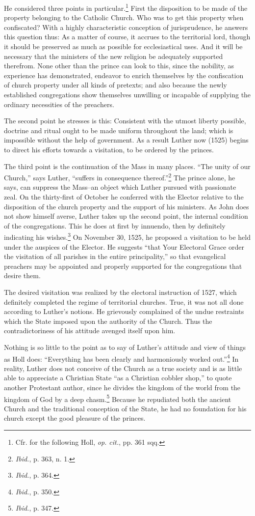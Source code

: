 He considered three points in particular.\footnote{Cfr. for the following Holl, \textit{op. cit.}, pp. 361 sqq.}
First the disposition to be made
of the property belonging to the Catholic Church. Who was to get this
property when confiscated? With a highly characteristic conception of jurisprudence,
he answers this question thus: As a matter of course, it accrues to
the territorial lord, though it should be preserved as much as possible for
ecclesiastical uses. And it will be necessary that the ministers of the new
religion be adequately supported therefrom. None other than the prince can
look to this, since the nobility, as experience has demonstrated, endeavor to
enrich themselves by the confiscation of church property under all kinds
of pretexts; and also because the newly established congregations show themselves
unwilling or incapable of supplying the ordinary necessities of the
preachers.

The second point he stresses is this: Consistent with the utmost liberty
possible, doctrine and ritual ought to be made uniform throughout the land;
which is impossible without the help of government. As a result Luther now
(1525) begins to direct his efforts towards a visitation, to be ordered by the
princes.

The third point is the continuation of the Mass in many places. “The
unity of our Church,” says Luther, “suffers in consequence thereof.”\footnote{\textit{Ibid.}, p. 363, n. 1.}
The prince alone, he says, can suppress the Mass--an object which
Luther pursued with passionate zeal.
On the thirty-first of October he conferred with the Elector relative to
the disposition of the church property and the support of his ministers. As
John does not show himself averse, Luther takes up the second point, the
internal condition of the congregations. This he does at first by innuendo,
then by definitely indicating his wishes.\footnote{\textit{Ibid.}, p. 364.}
On November 30, 1525, he proposed
a visitation to be held under the auspices of the Elector. He suggests
“that Your Electoral Grace order the visitation of all parishes in the entire
principality,” so that evangelical preachers may be appointed and properly
supported for the congregations that desire them.

The desired visitation was realized by the electoral instruction of
1527, which definitely completed the regime of territorial churches.
True, it was not all done according to Luther’s notions. He grievously
complained of the undue restraints which the State imposed upon
the authority of the Church. Thus the contradictoriness of his attitude
avenged itself upon him.

Nothing is so little to the point as to say of Luther’s attitude
and view of things as Holl does: “Everything has been clearly and
harmoniously worked out.”\footnote{\textit{Ibid.}, p. 350.}
In reality, Luther does not conceive
of the Church as a true society and is as little able to appreciate a
Christian State “as a Christian cobbler shop,” to quote another
Protestant author, since he divides the kingdom of the world from
the kingdom of God by a deep chasm.\footnote{\textit{Ibid.}, p. 347.}
Because he repudiated
both the ancient Church and the traditional conception of the State,
he had no foundation for his church except the good pleasure of the
princes.
